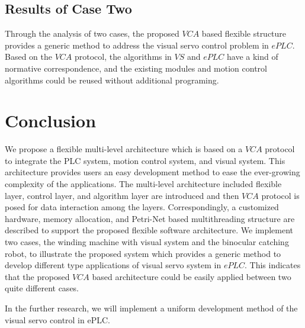 \documentclass[journal,UTF8]{IEEEtran}
\begin{document}
\subsection{Results of Case Two}
Through the analysis of two cases, the proposed $VCA$ based flexible structure provides a generic method to address the visual servo control problem in $ePLC$. Based on the $VCA$ protocol, the algorithms in $VS$ and $ePLC$ have a kind of normative correspondence,  and the existing modules and motion control algorithms could be reused without additional programing. 
\section{Conclusion}
\label{conclusion}
We propose a flexible multi-level architecture which is based on a $VCA$ protocol to integrate the PLC system, motion control system, and visual system. This architecture provides users an easy development method to ease the ever-growing complexity of the applications. The multi-level architecture included flexible layer, control layer, and algorithm layer are introduced and then $VCA$ protocol is posed for data interaction among the layers. Correspondingly, a customized hardware, memory allocation, and Petri-Net based multithreading structure are described to support the proposed flexible software architecture. We implement two cases, the winding machine with visual system and the binocular catching robot, to illustrate the proposed system which provides a generic method to develop different type applications of visual servo system in $ePLC$. This indicates that the proposed $VCA$ based architecture could be easily applied between two quite different cases.

In the further research, we will implement a uniform development method of the visual servo control in ePLC.

\ifCLASSOPTIONcaptionsoff
  \newpage
\fi





%
%
%
\end{document}
